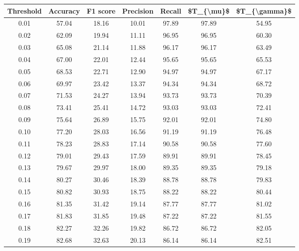 \begin{tabular}{|c|c|c|c|c|c|c|}
\hline
 Threshold &  Accuracy &  F1 score &  Precision &  Recall &  \$T\_\{\textbackslash mu\}\$ &  \$T\_\{\textbackslash gamma\}\$ \\
\hline
      0.01 &     57.04 &     18.16 &      10.01 &   97.89 &      97.89 &         54.95 \\
      0.02 &     62.09 &     19.94 &      11.11 &   96.95 &      96.95 &         60.30 \\
      0.03 &     65.08 &     21.14 &      11.88 &   96.17 &      96.17 &         63.49 \\
      0.04 &     67.00 &     22.01 &      12.44 &   95.65 &      95.65 &         65.53 \\
      0.05 &     68.53 &     22.71 &      12.90 &   94.97 &      94.97 &         67.17 \\
      0.06 &     69.97 &     23.42 &      13.37 &   94.34 &      94.34 &         68.72 \\
      0.07 &     71.53 &     24.27 &      13.94 &   93.73 &      93.73 &         70.39 \\
      0.08 &     73.41 &     25.41 &      14.72 &   93.03 &      93.03 &         72.41 \\
      0.09 &     75.64 &     26.89 &      15.75 &   92.01 &      92.01 &         74.80 \\
      0.10 &     77.20 &     28.03 &      16.56 &   91.19 &      91.19 &         76.48 \\
      0.11 &     78.23 &     28.83 &      17.14 &   90.58 &      90.58 &         77.60 \\
      0.12 &     79.01 &     29.43 &      17.59 &   89.91 &      89.91 &         78.45 \\
      0.13 &     79.67 &     29.97 &      18.00 &   89.35 &      89.35 &         79.18 \\
      0.14 &     80.27 &     30.46 &      18.39 &   88.78 &      88.78 &         79.83 \\
      0.15 &     80.82 &     30.93 &      18.75 &   88.22 &      88.22 &         80.44 \\
      0.16 &     81.35 &     31.42 &      19.14 &   87.77 &      87.77 &         81.02 \\
      0.17 &     81.83 &     31.85 &      19.48 &   87.22 &      87.22 &         81.55 \\
      0.18 &     82.27 &     32.26 &      19.82 &   86.72 &      86.72 &         82.05 \\
      0.19 &     82.68 &     32.63 &      20.13 &   86.14 &      86.14 &         82.51 \\

\end{tabular}
